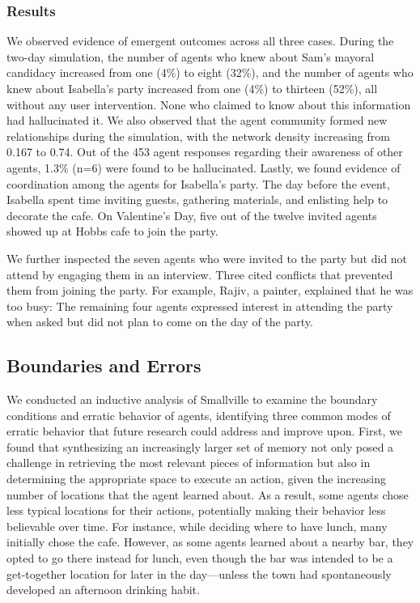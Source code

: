 \subsubsection{Results}
We observed evidence of emergent outcomes across all three cases. During the two-day simulation, the number of agents who knew about Sam's mayoral candidacy increased from one (4\%) to eight (32\%), and the number of agents who knew about Isabella's party increased from one (4\%) to thirteen (52\%), all without any user intervention. None who claimed to know about this information had hallucinated it. We also observed that the agent community formed new relationships during the simulation, with the network density increasing from 0.167 to 0.74. Out of the 453 agent responses regarding their awareness of other agents, 1.3\% (n=6) were found to be hallucinated. Lastly, we found evidence of coordination among the agents for Isabella's party. The day before the event, Isabella spent time inviting guests, gathering materials, and enlisting help to decorate the cafe. On Valentine's Day, five out of the twelve invited agents showed up at Hobbs cafe to join the party. 

We further inspected the seven agents who were invited to the party but did not attend by engaging them in an interview. Three cited conflicts that prevented them from joining the party. For example, Rajiv, a painter, explained that he was too busy:  The remaining four agents expressed interest in attending the party when asked but did not plan to come on the day of the party.

\subsection{Boundaries and Errors} 
We conducted an inductive analysis of Smallville to examine the boundary conditions and erratic behavior of agents, identifying three common modes of erratic behavior that future research could address and improve upon. First, we found that synthesizing an increasingly larger set of memory not only posed a challenge in retrieving the most relevant pieces of information but also in determining the appropriate space to execute an action, given the increasing number of locations that the agent learned about. As a result, some agents chose less typical locations for their actions, potentially making their behavior less believable over time. For instance, while deciding where to have lunch, many initially chose the cafe. However, as some agents learned about a nearby bar, they opted to go there instead for lunch, even though the bar was intended to be a get-together location for later in the day---unless the town had spontaneously developed an afternoon drinking habit.

